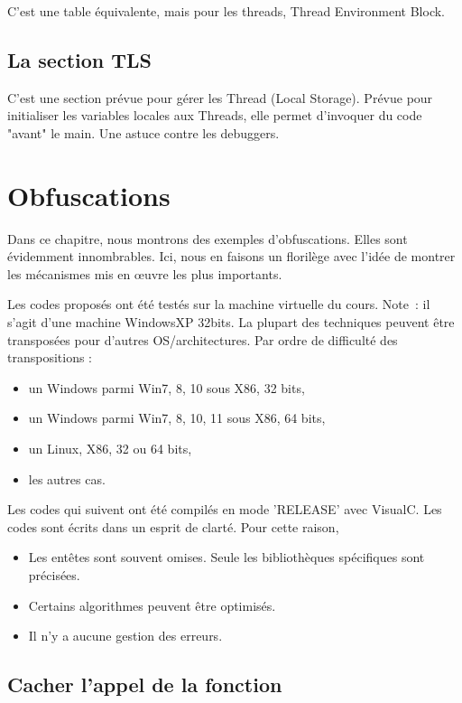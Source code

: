 \documentclass{book}
\begin{document}
C'est une table équivalente, mais pour les threads, Thread Environment Block. 

\section{La section TLS}

C'est une section prévue pour gérer les Thread (Local Storage). Prévue pour initialiser les variables locales aux Threads, elle permet d'invoquer du code "avant" le main. Une astuce contre les debuggers. 



\chapter{Obfuscations}

Dans ce chapitre, nous montrons des exemples d'obfuscations. Elles sont évidemment innombrables. Ici, nous en faisons un florilège avec l'idée de montrer les mécanismes mis en \oe uvre les plus importants. 

Les codes proposés ont été testés sur la machine virtuelle du cours. Note~: il s'agit d'une machine WindowsXP 32bits. La plupart des techniques peuvent être transposées pour d'autres OS/architectures. Par ordre de difficulté des transpositions : 
\begin{itemize}
	\item un Windows parmi Win7, 8, 10 sous X86, 32 bits,
	\item un Windows parmi Win7, 8, 10, 11 sous X86, 64 bits,
	\item un Linux, X86, 32 ou 64 bits,
	\item les autres cas. 
\end{itemize}

Les codes qui suivent ont été compilés en mode 'RELEASE' avec VisualC.  Les codes sont écrits dans un esprit de clarté. Pour cette raison, 
\begin{itemize}
	\item Les entêtes sont souvent omises. Seule les bibliothèques spécifiques sont précisées. 
	\item Certains algorithmes peuvent être optimisés. 
	\item Il n'y a aucune gestion des erreurs. 
\end{itemize}






\section{Cacher l'appel de la fonction}
\end{document}
